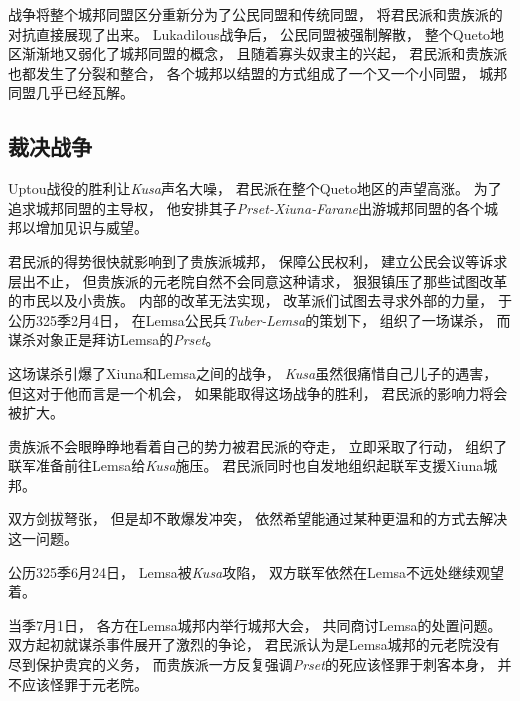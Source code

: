 \documentclass[UTF8,12pt,draft]{ctexbook}
\begin{document}
                战争将整个城邦同盟区分重新分为了公民同盟和传统同盟，
                将君民派和贵族派的对抗直接展现了出来。
                Lukadilous战争后，
                公民同盟被强制解散，
                整个Queto地区渐渐地又弱化了城邦同盟的概念，
                且随着寡头奴隶主的兴起，
                君民派和贵族派也都发生了分裂和整合，
                各个城邦以结盟的方式组成了一个又一个小同盟，
                城邦同盟几乎已经瓦解。
            \subsection{裁决战争}
                Uptou战役的胜利让\emph{Kusa}声名大噪，
                君民派在整个Queto地区的声望高涨。
                为了追求城邦同盟的主导权，
                他安排其子\emph{Prset-Xiuna-Farane}出游城邦同盟的各个城邦以增加见识与威望。

                君民派的得势很快就影响到了贵族派城邦，
                保障公民权利，
                建立公民会议等诉求层出不止，
                但贵族派的元老院自然不会同意这种请求，
                狠狠镇压了那些试图改革的市民以及小贵族。
                内部的改革无法实现，
                改革派们试图去寻求外部的力量，
                于公历325季2月4日，
                在Lemsa公民兵\emph{Tuber-Lemsa}的策划下，
                组织了一场谋杀，
                而谋杀对象正是拜访Lemsa的\emph{Prset}。

                这场谋杀引爆了Xiuna和Lemsa之间的战争，
                \emph{Kusa}虽然很痛惜自己儿子的遇害，
                但这对于他而言是一个机会，
                如果能取得这场战争的胜利，
                君民派的影响力将会被扩大。

                贵族派不会眼睁睁地看着自己的势力被君民派的夺走，
                立即采取了行动，
                组织了联军准备前往Lemsa给\emph{Kusa}施压。
                君民派同时也自发地组织起联军支援Xiuna城邦。

                双方剑拔弩张，
                但是却不敢爆发冲突，
                依然希望能通过某种更温和的方式去解决这一问题。

                公历325季6月24日，
                Lemsa被\emph{Kusa}攻陷，
                双方联军依然在Lemsa不远处继续观望着。

                当季7月1日，
                各方在Lemsa城邦内举行城邦大会，
                共同商讨Lemsa的处置问题。
                双方起初就谋杀事件展开了激烈的争论，
                君民派认为是Lemsa城邦的元老院没有尽到保护贵宾的义务，
                而贵族派一方反复强调\emph{Prset}的死应该怪罪于刺客本身，
                并不应该怪罪于元老院。
\end{document}
